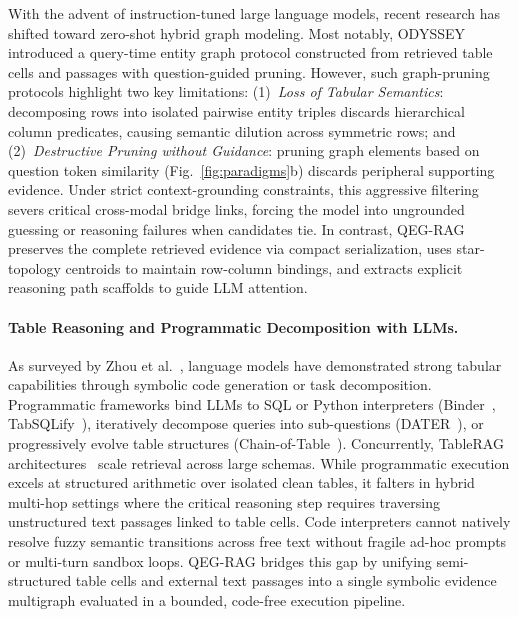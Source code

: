 \documentclass[runningheads]{llncs}
\begin{document}
With the advent of instruction-tuned large language models, recent research has shifted toward zero-shot hybrid graph modeling. Most notably, ODYSSEY~\cite{agarwal2025hybrid} introduced a query-time entity graph protocol constructed from retrieved table cells and passages with question-guided pruning. However, such graph-pruning protocols highlight two key limitations: (1)~\emph{Loss of Tabular Semantics}: decomposing rows into isolated pairwise entity triples discards hierarchical column predicates, causing semantic dilution across symmetric rows; and (2)~\emph{Destructive Pruning without Guidance}: pruning graph elements based on question token similarity (Fig.~\ref{fig:paradigms}b) discards peripheral supporting evidence. Under strict context-grounding constraints, this aggressive filtering severs critical cross-modal bridge links, forcing the model into ungrounded guessing or reasoning failures when candidates tie. In contrast, QEG-RAG preserves the complete retrieved evidence via compact serialization, uses star-topology centroids to maintain row-column bindings, and extracts explicit reasoning path scaffolds to guide LLM attention.

\paragraph{Table Reasoning and Programmatic Decomposition with LLMs.}
As surveyed by Zhou et al.~\cite{zhou2026tableqasurvey}, language models have demonstrated strong tabular capabilities through symbolic code generation or task decomposition. Programmatic frameworks bind LLMs to SQL or Python interpreters (Binder~\cite{cheng2023binder}, TabSQLify~\cite{nahid2024tabsqlify}), iteratively decompose queries into sub-questions (DATER~\cite{ye2023dater}), or progressively evolve table structures (Chain-of-Table~\cite{wang2024chainoftable}). Concurrently, TableRAG architectures~\cite{chen2024tablerag,yu2025tablerag} scale retrieval across large schemas. While programmatic execution excels at structured arithmetic over isolated clean tables, it falters in hybrid multi-hop settings where the critical reasoning step requires traversing unstructured text passages linked to table cells. Code interpreters cannot natively resolve fuzzy semantic transitions across free text without fragile ad-hoc prompts or multi-turn sandbox loops. QEG-RAG bridges this gap by unifying semi-structured table cells and external text passages into a single symbolic evidence multigraph evaluated in a bounded, code-free execution pipeline.
\end{document}
